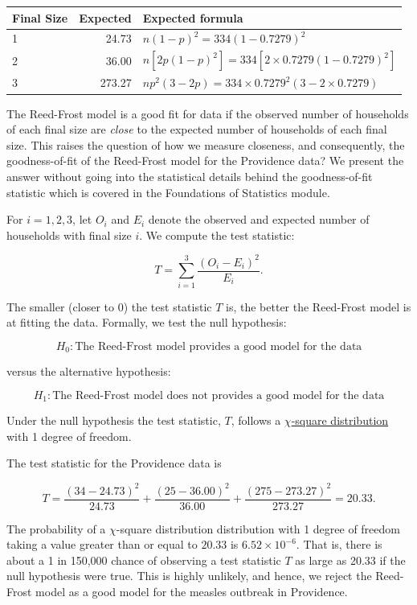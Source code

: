 \documentclass[
]{book}
\begin{document}
\begin{longtable}[]{@{}lrl@{}}
\toprule()
Final Size & Expected & Expected formula \\
\midrule()
\endhead
1 & 24.73 & \(n(1-p)^2 =334 (1-0.7279)^2\) \\
2 & 36.00 & \(n [2 p(1-p)^2] =334 \left[2 \times 0.7279 (1-0.7279)^2 \right]\) \\
3 & 273.27 & \(n p^2 (3-2p) =334 \times0.7279^2 (3 - 2 \times 0.7279)\) \\
\bottomrule()
\end{longtable}

The Reed-Frost model is a good fit for data if the observed number of households of each final size are \emph{close} to the expected number of households of each final size. This raises the question of how we measure closeness, and consequently, the goodness-of-fit of the Reed-Frost model for the Providence data? We present the answer without going into the statistical details behind the goodness-of-fit statistic which is covered in the Foundations of Statistics module.

For \(i=1, 2, 3\), let \(O_i\) and \(E_i\) denote the observed and expected number of households with final size \(i\). We compute the test statistic:

\[ T = \sum_{i=1}^3 \frac{(O_i -E_i)^2}{E_i}. \]

The smaller (closer to 0) the test statistic \(T\) is, the better the Reed-Frost model is at fitting the data.
Formally, we test the null hypothesis:

\[ H_0: \mbox{The Reed-Frost model provides a good model for the data} \]

versus the alternative hypothesis:

\[ H_1: \mbox{The Reed-Frost model does not provides a good model for the data} \]

Under the null hypothesis the test statistic, \(T\), follows a \href{https://en.wikipedia.org/wiki/Chi-squared_distribution}{\(\chi\)-square distribution} with 1 degree of freedom.

The test statistic for the Providence data is

\[ T = \frac{(34- 24.73)^2}{24.73} +  \frac{(25- 36.00)^2}{36.00} +  \frac{(275- 273.27)^2}{273.27} = 20.33. \]

The probability of a \(\chi\)-square distribution distribution with 1 degree of freedom taking a value greater than or equal to \(20.33\) is \(6.52 \times 10^{-6}\). That is, there is about a 1 in 150,000 chance of observing a test statistic \(T\) as large as 20.33 if the null hypothesis were true. This is highly unlikely, and hence, we reject the Reed-Frost model as a good model for the measles outbreak in Providence.
\end{document}
